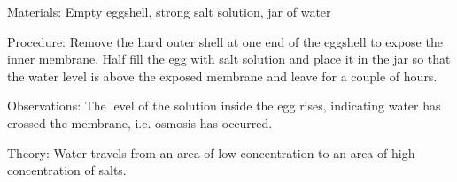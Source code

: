 \begin{multicols}{2}
\begin{description*}
\item[Materials:]{Empty eggshell, strong salt solution, jar of water}
\item[Procedure:]{Remove the hard outer shell at
one end of the eggshell to
expose the inner membrane. Half
fill the egg with salt solution and
place it in the jar so that the
water level is above the exposed
membrane and leave for a couple
of hours. }
\item[Observations:]{The level of
the solution inside the egg rises,
indicating water has crossed the
membrane, i.e. osmosis has
occurred.}
\item[Theory:]{Water travels from an area of low concentration to an area of high concentration of salts.}
\end{description*}


\end{multicols}

\pagebreak